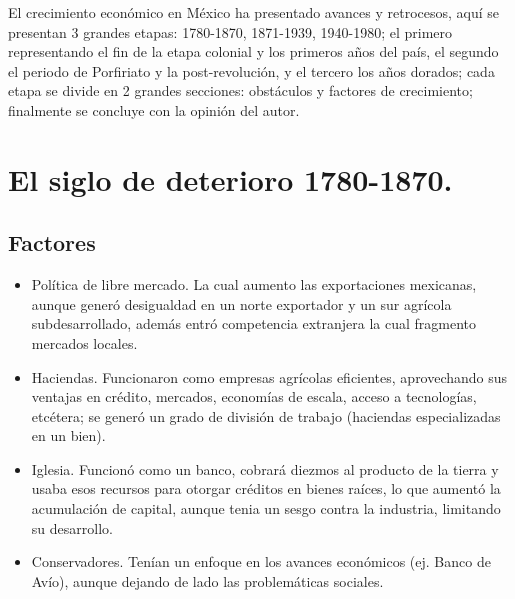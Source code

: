 El crecimiento económico en México ha presentado avances y retrocesos, aquí se presentan 3 grandes etapas: 1780-1870, 1871-1939, 1940-1980; el primero representando el fin de la etapa colonial y los primeros años del país, el segundo el periodo de Porfiriato y la post-revolución, y el tercero los años dorados; cada etapa se divide en 2 grandes secciones: obstáculos y factores de crecimiento; finalmente se concluye con la opinión del autor.

\section{El siglo de deterioro 1780-1870.}
\subsection{Factores}
\begin{itemize}
    \item Política de libre mercado. La cual aumento las exportaciones mexicanas, aunque generó desigualdad en un norte exportador y un sur agrícola subdesarrollado, además entró competencia extranjera la cual fragmento mercados locales.
    \item Haciendas. Funcionaron como empresas agrícolas eficientes, aprovechando sus ventajas en crédito, mercados, economías de escala, acceso a tecnologías, etcétera; se generó un grado de división de trabajo (haciendas especializadas en un bien).
    \item Iglesia. Funcionó como un banco, cobrará diezmos al producto de la tierra y usaba esos recursos para otorgar créditos en bienes raíces, lo que aumentó la acumulación de capital, aunque tenia un sesgo contra la industria, limitando su desarrollo.
    \item Conservadores. Tenían un enfoque en los avances económicos (ej. Banco de Avío), aunque dejando de lado las problemáticas sociales.
\end{itemize}

